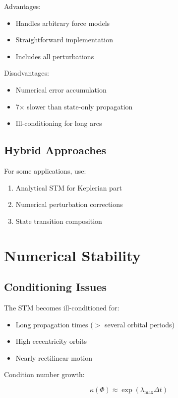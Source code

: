 Advantages:
\begin{itemize}
    \item Handles arbitrary force models
    \item Straightforward implementation
    \item Includes all perturbations
\end{itemize}

Disadvantages:
\begin{itemize}
    \item Numerical error accumulation
    \item 7$\times$ slower than state-only propagation
    \item Ill-conditioning for long arcs
\end{itemize}

\subsection{Hybrid Approaches}

For some applications, use:
\begin{enumerate}
    \item Analytical STM for Keplerian part
    \item Numerical perturbation corrections
    \item State transition composition
\end{enumerate}

\section{Numerical Stability}

\subsection{Conditioning Issues}

The STM becomes ill-conditioned for:
\begin{itemize}
    \item Long propagation times ($>$ several orbital periods)
    \item High eccentricity orbits
    \item Nearly rectilinear motion
\end{itemize}

Condition number growth:

\begin{equation}
    \kappa(\Phi) \approx \exp\left(\lambda_{\max} \Delta t\right)
\end{equation}

